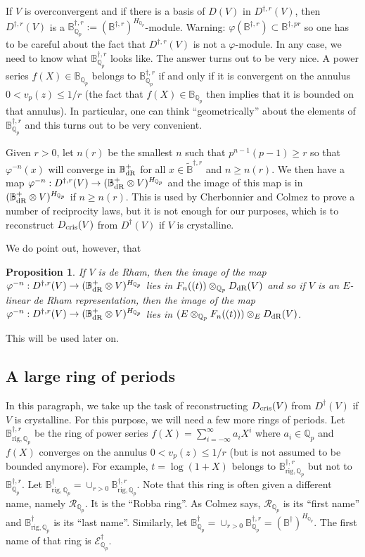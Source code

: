 \documentclass[11pt]{amsart}
\def\Q{{\mathbb Q}_p}
\def\ra{\rightarrow}
\def\bb{\mathbb{B}}
\newcommand{\btdag}[1]{\widetilde{\mathbb{B}}^{\dagger #1}}
\newcommand{\bdag}[1]{\mathbb{B}^{\dagger #1}}
\newcommand{\bnrig}[2]{\mathbb{B}^{\dagger #1}_{\mathrm{rig} #2}}
\def\bdR{\mathbb{B}_{\rm dR}}
\def\dcris{D_{\rm cris}}
\def\ddR{D_{\rm dR}}
\renewcommand{\ddag}[1]{D^{\dagger #1}}
\newtheorem{prop}[definit]{\bf{Proposition}}
\begin{document}
If $V$ is overconvergent and if there is a basis of $D(V)$ in 
$\ddag{,r}(V)$, then $\ddag{,r}(V)$ is a $\bdag{,r}_{\Q}:= 
(\bdag{,r})^{H_{\Q}}$-module. Warning: $\varphi(\bdag{,r}) \subset 
\bdag{,pr}$ so one has to be careful about the fact that 
$\ddag{,r}(V)$ is not a $\varphi$-module. In any case, we need to know 
what $\bdag{,r}_{\Q}$ looks like. The answer turns out to be very 
nice. A power series $f(X) \in \bb_{\Q}$ belongs to $\bdag{,r}_{\Q}$ 
if and only if it is convergent on the annulus $0 < v_p(z) 
\leq 1/r$ (the fact that $f(X) \in \bb_{\Q}$ then implies that it is 
bounded on that annulus). 
In particular, one can think ``geometrically'' about the 
elements of $\bdag{,r}_{\Q}$ and this turns out to be very 
convenient.  
 
Given $r > 0$, let $n(r)$ be the smallest $n$ such that $p^{n-1}(p-1) 
\geq r$ so that $\varphi^{-n}(x)$ will converge in $\bdR^+$ for all $x 
\in \btdag{,r}$ and $n \geq n(r)$. We then have a map $\varphi^{-n} : 
\ddag{,r}(V) \ra (\bdR^+ \otimes V)^{H_{\Q}}$ and the image of this 
map is in $(\bdR^+ \otimes V)^{H_{\Q}}$ if 
$n \geq n(r)$. This is used by Cherbonnier and Colmez to prove a 
number of reciprocity laws, but it is not enough for our purposes, 
which is to reconstruct $\dcris(V)$ from $\ddag{}(V)$ if $V$ is 
crystalline.  
 
We do point out, however, that  
 
\begin{prop}\label{imgiotan} 
If $V$ is de Rham, then the image 
of the map $\varphi^{-n} : \ddag{,r}(V) \ra (\bdR^+ \otimes 
V)^{H_{\Q}}$ lies in $F_n((t)) \otimes_{\Q} \ddR(V)$ and so if $V$ is 
an $E$-linear de Rham representation, then the image 
of the map $\varphi^{-n} : \ddag{,r}(V) \ra (\bdR^+ \otimes 
V)^{H_{\Q}}$ lies in $(E \otimes_{\Q} F_n((t))) \otimes_{E} 
\ddR(V)$.  
\end{prop} 
 
This will be used later on. 
 
\subsection{A large ring of periods} 
In this paragraph, we take up the task of reconstructing  
$\dcris(V)$ from $\ddag{}(V)$ if $V$ is crystalline. For this purpose, 
we will need a few more rings of periods. Let $\bnrig{,r}{,\Q}$ be  
the ring of power series $f(X) = \sum_{i=-\infty}^{\infty} a_i X^i$ 
where $a_i \in \Q$ and $f(X)$ converges on the annulus $0 < v_p(z) 
\leq 1/r$ (but is not assumed to be bounded anymore).  
For example, $t=\log(1+X)$ belongs to $\bnrig{,r}{,\Q}$ but not to 
$\bdag{,r}_{\Q}$. Let $\bnrig{}{,\Q} =  \cup_{r > 0} 
\bnrig{,r}{,\Q}$. Note that this ring is often given a different name, 
namely $\mathcal{R}_{\Q}$. It is the ``Robba ring''. As Colmez says, 
$\mathcal{R}_{\Q}$ is its ``first name'' and $\bnrig{}{,\Q}$ is its ``last 
name''. Similarly, let $\bdag{}_{\Q}=  \cup_{r > 0} \bdag{,r}_{\Q} = 
(\bdag{})^{H_{\Q}}$. The first name of that ring is 
$\mathcal{E}^{\dagger}_{\Q}$.  
 
\end{document}
